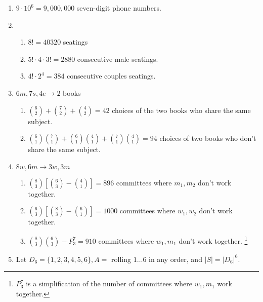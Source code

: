\documentclass{article}
\title{\MakeUppercase{\jobname}}
\author{Justin Nguyen}
\date{\today}
\newcommand{\set}[1]{\{#1\}}
\begin{document}
\maketitle

\begin{enumerate}
  \item $9\cdot 10^6 = 9,000,000$ seven-digit phone numbers. %
  \item \begin{enumerate}
    \item $8! = 40320$ seatings %
    \item $5!\cdot 4 \cdot 3! = 2880$ consecutive male seatings. %
    \item $4!\cdot 2^4 = 384$ consecutive couples seatings. %
  \end{enumerate}
  \item $6m, 7s, 4e \to 2$ books
  \begin{enumerate}
    \item $\binom{6}{2} + \binom{7}{2} + \binom{4}{2} = 42$ choices of the two books who share the same subject. %
    \item $\binom{6}{1}\binom{7}{1} + \binom{6}{1}\binom{4}{1} + \binom{7}{1}\binom{4}{1} = 94$ choices of two books who don't share the same subject. %
  \end{enumerate}
  \item $8w, 6m \to 3w, 3m$
  \begin{enumerate}
    \item $\binom{8}{3}[\binom{6}{3} - \binom{4}{1}] = 896$ committees where $m_1, m_2$ don't work together.
    \item $\binom{6}{3}[\binom{8}{3} - \binom{6}{1}] = 1000$ committees where $w_1, w_2$ don't work together.
    \item $\binom{8}{3}\binom{6}{3} - P^7_3 = 910$ committees where $w_1, m_1$ don't work together.%
    \footnote{$P^7_3$ is a simplification of the number of committees where $w_1, m_1$ work together.}
  \end{enumerate}
  \item Let $D_6 = \set{1,2,3,4,5,6},A =$ rolling $1\ldots 6$ in any order, and $|S| = |D_6|^6$.\\

\end{enumerate}
\end{document}
